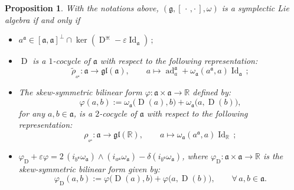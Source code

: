 \documentclass[final,1p,times,nopreprintline]{elsarticle}
\newtheorem{proposition}{Proposition}[section]
\theoremstyle{definition}
\numberwithin{equation}{section}
\newcommand{\rel}{\mathbb{R}}
\newcommand{\w}{\omega}
\newcommand{\id}{\operatorname{Id}}
\newcommand{\g}{\mathfrak{g}}
\newcommand{\ai}{\mathfrak{a}}
\newcommand{\ad}{\operatorname{ad}}
\numberwithin{equation}{section}
\newcommand{\D}{\operatorname{D}}
\newcommand{\gl}{\mathfrak{gl}}
\newcommand{\cro}{[\,\cdot\,,\cdot\,]}
\begin{document}
\begin{proposition}\label{PropSymLiAlgDoblExtDim1Prop0}
	With the notations above, $(\g,\cro,\w)$ is a symplectic Lie algebra if and only if
	\begin{itemize}
		\item[$1.$] $	a^\ai\in[\ai,\ai]^\perp\cap\ker\left(\D^\divideontimes-\varepsilon\id_\ai\right)\,;$
		\item[$2.$] $\D$ is a $1$-cocycle of $\ai$ with respect to the following representation:
		\begin{equation*}
		\widetilde{\rho}_{_{a^\ai}}:\ai\longrightarrow\gl(\ai),\qquad a\longmapsto\ad^\ai_a+\w_\ai(a^\ai,a)\id_\ai\,;
		\end{equation*}
		\item[$3.$] The skew-symmetric bilinear form $\varphi:\ai\times\ai\to\rel$ defined by:
		\begin{equation*}
		\varphi(a,b):=\w_\ai\big(\D(a),b\big)+\w_\ai\big(a,\D(b)\big),
		\end{equation*}
for any $a,b\in\ai$, is a $2$-cocycle of $\ai$ with respect to the following representation: 
		\begin{equation*}
		\rho_{_{a^\ai}}:\ai\longrightarrow\gl(\rel),\qquad a\longmapsto \w_\ai(a^\ai,a)\id_\rel\,;
		\end{equation*}
		\item[$4.$] $\varphi_{\D}+\varepsilon\varphi=2\,(i_{b^\ai}\w_\ai)\wedge (i_{a^\ai}\w_\ai)-\delta(i_{b^\ai}\w_\ai)$, where $\varphi_{\D}:\ai\times\ai\to\rel$ is the skew-symmetric bilinear form given by:
		\begin{equation*}
		\varphi_{\D}(a,b):=\varphi\big(\D(a),b\big)+\varphi\big(a,\D(b)\big),\qquad\forall\,a,b\in\ai.
		\end{equation*}
	\end{itemize}
\end{proposition}
\end{document}
